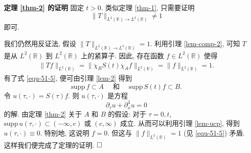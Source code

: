 \documentclass[master]{cugthesis}
\newcommand\R{\ensuremath{\mathbb{R}}}
\begin{document}
{\bf {定理 \ref{thm-2}} 的证明} 固定 $t>0$. 类似定理 \ref{thm-1}, 只需要证明 $$
\|T\|_{L^2(\R)\to L^2(\R)}\neq 1
$$
即可.

我们仍然用反证法, 假设 $\|T\|_{L^2(\R)\to L^2(\R)}= 1$. 利用引理 \ref{lem-comp-2}, 可知 $T$ 是从 $L^2(\R)$ 到 $L^2(\R)$ 上的紧算子. 因此, 存在函数 $f\in L^2(\R)$ 使得
\begin{align}\label{equ-51-5}
\|Tf\|_{L^2(\R)}=\|\chi_BS(t)\chi_Af\|_{L^2(\R)}=\|f\|_{L^2(\R)}=1.
\end{align}
有了式 \eqref{equ-51-5}, 便可由引理 \ref{lem-2} 得到
$$\mathrm{supp }\, f\subset A\quad \text{ 和 }\quad \mathrm{supp }\, S(t)f \subset B.$$
令 $u(\tau,\cdot)=S(\tau)f$. 则 $u(\tau,\cdot)$ 是方程
$$
\partial_\tau u+\partial_x^3u=0
$$
的解.
由定理 \ref{thm-2} 关于 $A$ 和 $B$ 的假设: 对于 $\tau=0,t$, $\mathrm{supp }\,u(\tau,\cdot)\subset (-\infty,c)$ 或 $(c,\infty)$ 成立. 从而可以利用引理 \ref{lem-ucp}, 得到 $u(\tau,\cdot)\equiv 0$. 特别地, 这说明 $f=0$. 但这与 $\|f\|_{L^2(\R)}=1$ (见 \eqref{equ-51-5}) 矛盾. 这样我们便完成了定理的证明. $\hfill\Box$
%

   
   
\end{document}
